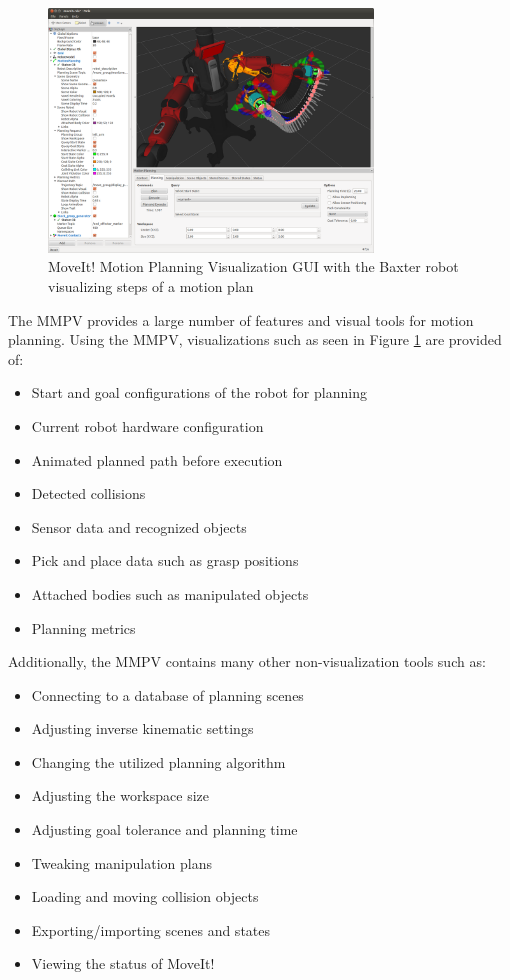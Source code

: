 \documentclass[10pt,journal,compsoc]{joser1}
\begin{document}
{\begin{figure}[!t]
\centering
\includegraphics[width=3.4in]{coleman_20131110_f09}
\caption{MoveIt! Motion Planning Visualization GUI with the Baxter robot
visualizing steps of a motion plan}
\label{fig:motion_plan}	
\end{figure}

The MMPV provides a large number of features and visual tools for motion
planning. Using the MMPV, visualizations such as seen in Figure
\ref{fig:motion_plan} are provided of:

\begin{itemize}
    \item Start and goal configurations of the robot for planning
    \item Current robot hardware configuration
    \item Animated planned path before execution
    \item Detected collisions
    \item Sensor data and recognized objects
    \item Pick and place data such as grasp positions
    \item Attached bodies such as manipulated objects
    \item Planning metrics
\end{itemize}

Additionally, the MMPV contains many other non-visualization tools such as:
\begin{itemize}
    \item Connecting to a database of planning scenes
    \item Adjusting inverse kinematic settings
    \item Changing the utilized planning algorithm
    \item Adjusting the workspace size
    \item Adjusting goal tolerance and planning time
    \item Tweaking manipulation plans
    \item Loading and moving collision objects
    \item Exporting/importing scenes and states
    \item Viewing the status of MoveIt!
\end{itemize}

}
\end{document}
